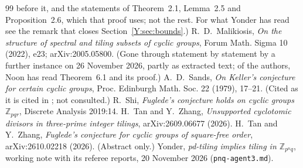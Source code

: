 \documentclass[11pt,a4paper]{amsart}
\theoremstyle{definition}
\theoremstyle{remark}
\newcommand{\Z}{\mathbb{Z}}
\newcommand{\lean}[1]{\texttt{#1}}
\begin{document}
\begin{thebibliography}{99}
 before it, and the statements of Theorem~2.1, Lemma~2.5 and Proposition~2.6, which that proof uses; not the rest.
 For what Yonder has read see the remark that closes Section~\ref{Y:sec:bounds}.)
 R.~D.~Malikiosis, \emph{On the structure of spectral and tiling subsets of cyclic groups}, Forum
 Math. Sigma 10 (2022), e23; arXiv:2005.05800. (Gone through statement by statement by a further instance on
 26 November 2026, partly as extracted text; of the authors, Noon has read Theorem~6.1 and its proof.)
 A.~D.~Sands, \emph{On Keller's conjecture for certain cyclic groups}, Proc. Edinburgh Math. Soc. 22
(1979), 17--21. (Cited as it is cited in \cite{CM}; not consulted.)
 R.~Shi, \emph{Fuglede's conjecture holds on cyclic groups $\Z_{pqr}$}, Discrete Analysis 2019:14.
 H.~Tan and Y.~Zhang, \emph{Unsupported cyclotomic divisors in three-prime integer tilings},
 arXiv:2609.06677 (2026).
 H.~Tan and Y.~Zhang, \emph{Fuglede's conjecture for cyclic groups of square-free order},
 arXiv:2610.02218 (2026). (Abstract only.)
 Yonder, \emph{pd-tiling implies tiling in $\Z_{p^nq}$}, working note with its referee
 reports, 20 November 2026 (\lean{pnq-agent3.md}).
\end{thebibliography}
\end{document}
